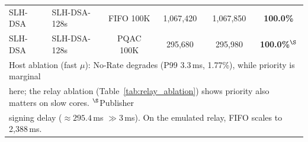 \documentclass[journal]{IEEEtran}
\begin{document}
\begin{table}[t]
{\begin{tabular}{llcccc}
SLH-DSA   & SLH-DSA-128s & FIFO 100K       & 1,067,420& 1,067,850 & \textbf{100.0\%} \\
SLH-DSA   & SLH-DSA-128s & PQAC 100K       & 295,680  & 295,980   & \textbf{100.0\%}$^\S$ \\
\bottomrule
\multicolumn{6}{l}{\scriptsize Host ablation (fast $\mu$): No-Rate degrades (P99 $3.3$\,ms, 1.77\%), while priority is marginal} \\
\multicolumn{6}{l}{\scriptsize here; the relay ablation (Table~\ref{tab:relay_ablation}) shows priority also matters on slow cores. $^\S$Publisher} \\
\multicolumn{6}{l}{\scriptsize signing delay ($\approx 295.4$\,ms $\gg 3$\,ms). On the emulated relay, FIFO scales to 2,388\,ms.} \\
\end{tabular}%
}
\end{table}

\begin{table}[t]
\centering
\caption{Threshold Sensitivity and Multi-Publisher Scalability (PQAC, RSA-2048, 100K\,pps Attack; host platform, \emph{dynamic-learning} cold-start mode). Miss rates exceed the 1\% strict target because these runs include the cold-start transient; the SCD pre-provisioned and converged steady-state modes achieve 0.00\% (Table~\ref{tab:core_results}).}
\label{tab:sensitivity_scalability}
\scriptsize
{}
\end{table}
\end{document}

